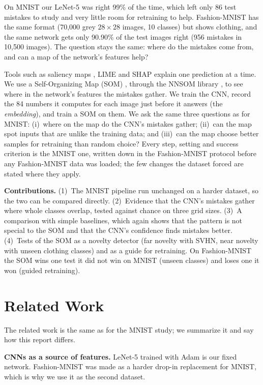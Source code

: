 \documentclass[11pt]{article}
\begin{document}
On MNIST our LeNet-5 \parencite{lecun1998gradient} was right 99\% of the time, which left only 86 test mistakes to study and very little room for retraining to help. Fashion-MNIST \parencite{xiao2017fashion} has the same format (70,000 grey $28\times28$ images, 10 classes) but shows clothing, and the same network gets only 90.90\% of the test images right (956 mistakes in 10,500 images).
The question stays the same: where do the mistakes come from, and can a map of the network's features help?

Tools such as saliency maps \parencite{simonyan2014saliency}, LIME \parencite{ribeiro2016lime} and SHAP \parencite{lundberg2017shap} explain one prediction at a time. We use a Self-Organizing Map (SOM) \parencite{kohonen1990som}, through the NNSOM library \parencite{jafari_nnsom}, to see where in the network's features the mistakes gather.
We train the CNN, record the 84 numbers it computes for each image just before it answers (the \emph{embedding}), and train a SOM on them. We ask the same three questions as for MNIST:
(i)~where on the map do the CNN's mistakes gather; (ii)~can the map spot inputs that are unlike the training data; and (iii)~can the map choose better samples for retraining than random choice?
Every step, setting and success criterion is the MNIST one, written down in the Fashion-MNIST protocol before any Fashion-MNIST data was loaded; the few changes the dataset forced are stated where they apply.

\textbf{Contributions.}
(1)~The MNIST pipeline run unchanged on a harder dataset, so the two can be compared directly.
(2)~Evidence that the CNN's mistakes gather where whole classes overlap, tested against chance on three grid sizes.
(3)~A comparison with simple baselines, which again shows that the pattern is not special to the SOM and that the CNN's confidence finds mistakes better.
(4)~Tests of the SOM as a novelty detector (far novelty with SVHN, near novelty with unseen clothing classes) and as a guide for retraining. On Fashion-MNIST the SOM wins one test it did not win on MNIST (unseen classes) and loses one it won (guided retraining).

\section{Related Work}

The related work is the same as for the MNIST study; we summarize it and say how this report differs.

\textbf{CNNs as a source of features.} LeNet-5 \parencite{lecun1998gradient} trained with Adam \parencite{kingma2015adam} is our fixed network. Fashion-MNIST \parencite{xiao2017fashion} was made as a harder drop-in replacement for MNIST, which is why we use it as the second dataset.
\end{document}
